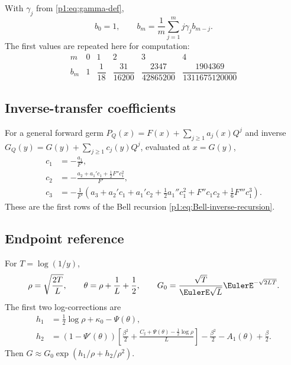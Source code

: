 \documentclass[11pt,oneside]{article}
\numberwithin{equation}{section}
\theoremstyle{definition}
\theoremstyle{remark}
\begin{document}
With $\gamma_j$ from \eqref{p1:eq:gamma-def},
\begin{equation}
 b_0=1,
 \qquad
 b_m=\frac1m\sum_{j=1}^{m}j\gamma_jb_{m-j}.
 \label{p1:eq:b-reference-rec}
\end{equation}
The first values are repeated here for computation:
\begin{equation}
 \begin{array}{c|ccccc}
 m&0&1&2&3&4\\ \hline
 b_m&1&\dfrac1{18}&\dfrac{31}{16200}&
 \dfrac{2347}{42865200}&\dfrac{1904369}{1311675120000}
 \end{array}
 \label{p1:eq:b-reference-table}
\end{equation}

\subsection{Inverse-transfer coefficients}

For a general forward germ
$P_Q(x)=F(x)+\sum_{j\ge1}a_j(x)Q^j$ and inverse
$G_Q(y)=G(y)+\sum_{j\ge1}c_j(y)Q^j$, evaluated at $x=G(y)$,
\begin{align}
 c_1&=-\frac{a_1}{F'},
 \label{p1:eq:c1-general-ref}\\
 c_2&=-\frac{a_2+a_1'c_1+\tfrac12F''c_1^2}{F'},
 \label{p1:eq:c2-general-ref}\\
 c_3&=-\frac{1}{F'}\left(
 a_3+a_2'c_1+a_1'c_2+\frac12a_1''c_1^2
 +F''c_1c_2+\frac16F'''c_1^3\right).
 \label{p1:eq:c3-general-ref}
\end{align}
These are the first rows of the Bell recursion \eqref{p1:eq:Bell-inverse-recursion}.

\subsection{Endpoint reference}

For $T=\log(1/y)$,
\begin{equation}
 \rho=\sqrt{\frac{2T}{L}},
 \qquad
 \theta=\rho+\frac1L+\frac12,
 \qquad
 G_0=\frac{\sqrt T}{\EulerE\sqrt L}\EulerE^{-\sqrt{2LT}}.
 \label{p1:eq:endpoint-reference-vars}
\end{equation}
The first two log-corrections are
\begin{align}
 h_1&=\frac12\log\rho+\kappa_0-\Psi(\theta),
 \label{p1:eq:h1-reference}\\
 h_2&=(1-\Psi'(\theta))
 \left[\frac{\beta^2}{2}+\frac{C_{\sharp}+\Psi(\theta)-\tfrac12\log\rho}{L}\right]
 -\frac{\beta^2}{2}-A_1(\theta)+\frac\beta2.
 \label{p1:eq:h2-reference}
\end{align}
Then $G\approx G_0\exp(h_1/\rho+h_2/\rho^2)$.
\end{document}
